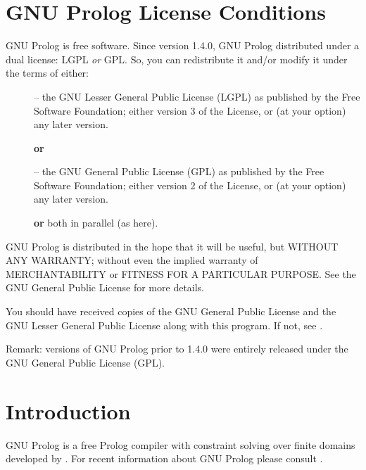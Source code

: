 \newpage
\section{GNU Prolog License Conditions}

GNU Prolog is free software. Since version 1.4.0, GNU Prolog distributed under
a dual license: LGPL \textit{or} GPL. So, you can redistribute it and/or
modify it under the terms of either:

\begin{description}

\item[] -- the GNU Lesser General Public License (LGPL) as published by the Free
  Software Foundation; either version 3 of the License, or (at your
  option) any later version. 

\item[] \textbf{or} 

\item[] -- the GNU General Public License (GPL) as published by the Free
  Software Foundation; either version 2 of the License, or (at your option)
  any later version.

\item[] \textbf{or} both in parallel (as here). 
\end{description}

GNU Prolog is distributed in the hope that it will be useful,
but WITHOUT ANY WARRANTY; without even the implied warranty of
MERCHANTABILITY or FITNESS FOR A PARTICULAR PURPOSE.  See the GNU
General Public License for more details.

You should have received copies of the GNU General Public License and
the GNU Lesser General Public License along with this program. If
not, see .

Remark: versions of GNU Prolog prior to 1.4.0 were entirely released under
the GNU General Public License (GPL).

\section{Introduction}

GNU Prolog \cite{gnu-prolog} is a free Prolog compiler with constraint
solving over finite domains developed by
.  For recent
information about GNU Prolog please consult
.

